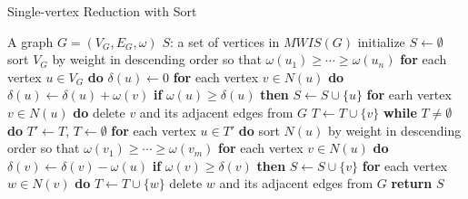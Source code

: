 \documentclass[sigconf, nonacm]{acmart}
\begin{document}
\begin{algorithm}[tbp]
\caption{Single-vertex Reduction with Sort}
\label{alg:1vertexsort}
\begin{algorithmic}[1]
	\REQUIRE A graph $G=(V_G,E_G,\omega)$
	\ENSURE $S$: a set of vertices in $MWIS(G)$
	\STATE   initialize $S\leftarrow \emptyset$%
	\STATE   sort $V_G$ by weight in descending order so that $\omega(u_1)\geq\cdots\geq\omega(u_n)$
	\STATE   \textbf{for} each vertex $u\in V_G$ \textbf{do}
	\STATE   \quad $\delta(u)\leftarrow 0$
	\STATE   \quad \textbf{for} each vertex $v\in N(u)$ \textbf{do}
	\STATE   \quad \quad $\delta(u)\leftarrow\delta(u) + \omega(v)$
	\STATE   \quad \textbf{if} $\omega(u)\geq\delta(u)$ \textbf{then}
	\STATE   \quad \quad $S \leftarrow S\cup \{u\}$
	\STATE   \quad \quad \textbf{for} earh vertex $v\in N(u)$ \textbf{do}
	\STATE   \quad \quad \quad delete $v$ and its adjacent edges from $G$
	\STATE   \quad \quad \quad $T \leftarrow T\cup \{v\}$
	\STATE   \textbf{while} $T\neq \emptyset$ \textbf{do}
	\STATE   \quad $T' \leftarrow T$, $T\leftarrow \emptyset$
	\STATE   \quad \textbf{for} each vertex $u\in T'$ \textbf{do}
	\STATE   \quad \quad sort $N(u)$ by weight in descending order so that $\omega(v_1)\geq\cdots\geq\omega(v_m)$
	\STATE   \quad \quad \textbf{for} each vertex $v\in N(u)$ \textbf{do}
	\STATE   \quad \quad \quad $\delta(v) \leftarrow \delta(v) - \omega(u)$
	\STATE   \quad \quad \quad \textbf{if} $\omega(v)\geq \delta(v)$ \textbf{then}
	\STATE   \quad \quad \quad \quad $S\leftarrow S\cup\{v\}$
	\STATE   \quad \quad \quad \quad \textbf{for} each vertex $w\in N(v)$ \textbf{do}
	\STATE   \quad \quad \quad \quad \quad $T\leftarrow T\cup\{w\}$
	\STATE   \quad \quad \quad \quad \quad delete $w$ and its adjacent edges from $G$
	\STATE   \textbf{return} $S$
\end{algorithmic}
\end{algorithm}
\end{document}

